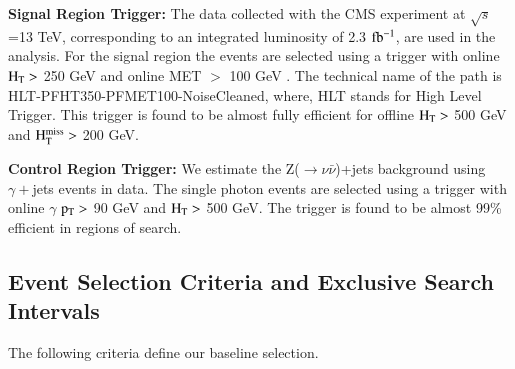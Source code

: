 {\bf Signal Region Trigger:}
The data collected with the CMS experiment at $\sqrt{s}$=13 TeV, corresponding to an integrated luminosity of 2.3 $\rm fb^{-1}$, are used in the analysis. For the signal region the events are selected using a trigger with online $\rm H_{T} >$  250 GeV and online MET $>$ 100 GeV . The technical name of the path is HLT-PFHT350-PFMET100-NoiseCleaned, where, HLT stands for High Level Trigger. This trigger is found to be almost fully efficient for offline $\rm H_{T} > $ 500 GeV and $\rm H_{T}^{miss} > $ 200 GeV.


{\bf Control Region Trigger: }
We estimate the Z($\rightarrow \nu\bar{\nu}$)+jets background using $\gamma +$jets events in data. The single photon events are selected using a trigger with online $\gamma$ $\rm p_{T} > $  90 GeV and $\rm H_{T} > $ 500 GeV. The trigger is found to be almost 99\% efficient in regions of search.  



\subsection{Event Selection Criteria and Exclusive Search Intervals}

The following criteria define our baseline selection. 


